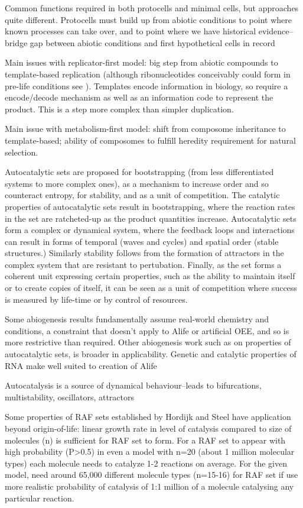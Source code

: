 Common functions required in both protocells and minimal cells, but
approaches quite different. Protocells must build up from abiotic
conditions to point where known processes can take over, and to point
where we have historical evidence--bridge gap between abiotic
conditions and first hypothetical cells in record

Main issues with replicator-first model: big step from abiotic compounds
to template-based replication (although ribonucleotides conceivably
could form in pre-life conditions see \autocite{Powner2009}). Templates
encode information in biology, so require a encode/decode mechanism as
well as an information code to represent the product. This is a step
more complex than simpler duplication.

Main issue with metabolism-first model: shift from composome inheritance
to template-based; ability of composomes to fulfill heredity requirement
for natural selection.

Autocatalytic sets are proposed for bootstrapping (from less
differentiated systems to more complex ones), as a mechanism to increase
order and so counteract entropy, for stability, and as a unit of
competition. The catalytic properties of autocatalytic sets result in
bootstrapping, where the reaction rates in the set are ratcheted-up as
the product quantities increase. Autocatalytic sets form a complex or
dynamical system, where the feedback loops and interactions can result
in forms of temporal (waves and cycles) and spatial order (stable
structures.) Similarly stability follows from the formation of
attractors in the complex system that are resistant to pertubation.
Finally, as the set forms a coherent unit expressing certain properties,
such as the ability to maintain itself or to create copies of itself, it
can be seen as a unit of competition where success is measured by
life-time or by control of resources.

Some abiogenesis results fundamentally assume real-world chemistry and
conditions, a constraint that doesn't apply to Alife or artificial OEE,
and so is more restrictive than required. Other abiogenesis work such as
on properties of autocatalytic sets, is broader in applicability.
Genetic and catalytic properties of RNA make well suited to creation of
Alife \autocite{Cheng2010}

Autocatalysis is a source of dynamical behaviour--leads to
bifurcations, multistability, oscillators, attractors
\autocite{Plasson2010}

Some properties of RAF sets established by Hordijk and Steel have
application beyond origin-of-life: linear growth rate in level of
catalysis compared to size of molecules (n) is sufficient for RAF set to
form. For a RAF set to appear with high probability (P\textgreater{}0.5)
in even a model with n=20 (about 1 million molecular types) each
molecule needs to catalyze 1-2 reactions on average. For the given
model, need around 65,000 different molecule types (n=15-16) for RAF set
if use more realistic probability of catalysis of 1:1 million of a
molecule catalysing any particular reaction. \autocite{Hordijk2011}

